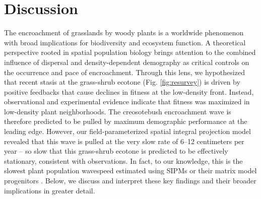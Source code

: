 \documentclass[11pt]{article}\usepackage[]{graphicx}\usepackage[usenames,dvipsnames]{xcolor}
\begin{document}
\section*{Discussion}

The encroachment of grasslands by woody plants is a worldwide phenomenon with broad implications for biodiversity and ecosystem function. 
A theoretical perspective rooted in spatial population biology brings attention to the combined influence of dispersal and density-dependent demography as critical controls on the occurrence and pace of encroachment.
Through this lens, we hypothesized that recent stasis at the grass-shrub ecotone (Fig. \ref{fig:resurvey}) is driven by positive feedbacks that cause declines in fitness at the low-density front.
Instead, observational and experimental evidence indicate that fitness was maximized in low-density plant neighborhoods.
The creosotebush encroachment wave is therefore predicted to be pulled by maximum demographic performance at the leading edge.
However, our field-parameterized spatial integral projection model revealed that this wave is pulled at the very slow rate of 6--12 centimeters per year -- so slow that this grass-shrub ecotone is predicted to be effectively stationary, consistent with observations. 
In fact, to our knowledge, this is the slowest plant population wavespeed estimated using SIPMs or their matrix model progenitors \citep{neubert2000demography}. 
Below, we discuss and interpret these key findings and their broader implications in greater detail. 
\end{document}
